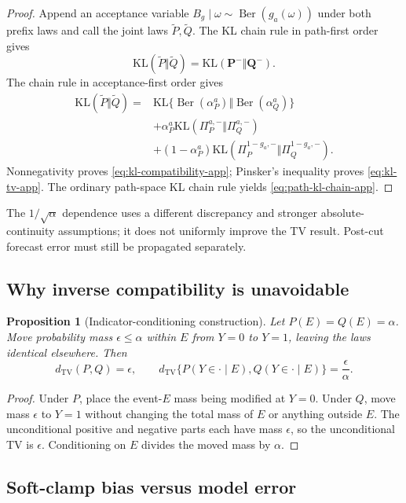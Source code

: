 \documentclass{article}
\newcommand{\KL}{\mathrm{KL}}
\newcommand{\TV}{d_{\mathrm{TV}}}
\newcommand{\PathP}{\mathbf P}
\newcommand{\PathQ}{\mathbf Q}
\DeclareMathOperator{\Ber}{Ber}
\newtheorem{proposition}[definition]{Proposition}
\theoremstyle{remark}
\begin{document}
\begin{proof}
Append an acceptance variable
\(B_g\mid\omega\sim\Ber(g_a(\omega))\) under both prefix laws and call the
joint laws \(\widetilde P,\widetilde Q\). The KL chain rule in path-first order
gives
\[
  \KL(\widetilde P\Vert\widetilde Q)
  =
  \KL(\PathP^-\Vert\PathQ^-).
\]
The chain rule in acceptance-first order gives
\[
\begin{split}
  \KL(\widetilde P\Vert\widetilde Q)
  ={}&
  \KL\{\Ber(\alpha_P^a)\Vert\Ber(\alpha_Q^a)\}\\
  &+
  \alpha_P^a
  \KL(\Pi_P^{a,-}\Vert\Pi_Q^{a,-})\\
  &+
  (1-\alpha_P^a)
  \KL(\Pi_P^{1-g_a,-}\Vert\Pi_Q^{1-g_a,-}).
\end{split}
\]
Nonnegativity proves \cref{eq:kl-compatibility-app}; Pinsker's inequality
proves \cref{eq:kl-tv-app}. The ordinary path-space KL chain rule yields
\cref{eq:path-kl-chain-app}.
\end{proof}

The \(1/\sqrt{\alpha}\) dependence uses a different discrepancy and stronger
absolute-continuity assumptions; it does not uniformly improve the TV result.
Post-cut forecast error must still be propagated separately.

\subsection{Why inverse compatibility is unavoidable}

\begin{proposition}[Indicator-conditioning construction]
\label{prop:indicator-lower-app}
Let \(P(E)=Q(E)=\alpha\). Move probability mass
\(\epsilon\leq\alpha\) within \(E\) from \(Y=0\) to \(Y=1\), leaving the laws
identical elsewhere. Then
\[
  \TV(P,Q)=\epsilon,
  \qquad
  \TV\{P(Y\in\cdot\mid E),Q(Y\in\cdot\mid E)\}
  =
  \frac{\epsilon}{\alpha}.
\]
\end{proposition}

\begin{proof}
Under \(P\), place the event-\(E\) mass being modified at \(Y=0\). Under \(Q\),
move mass \(\epsilon\) to \(Y=1\) without changing the total mass of \(E\) or
anything outside \(E\). The unconditional positive and negative parts each
have mass \(\epsilon\), so the unconditional TV is \(\epsilon\). Conditioning
on \(E\) divides the moved mass by \(\alpha\).
\end{proof}

\subsection{Soft-clamp bias versus model error}
\end{document}
